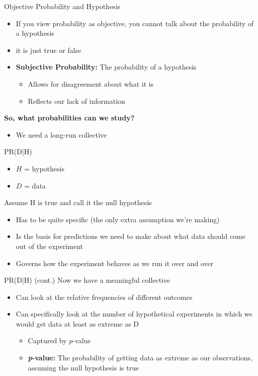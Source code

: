 \documentclass[12pt, block=fill]{beamer}
\begin{document}
\begin{frame}{Objective Probability and Hypothesis}
\begin{itemize}
    \item If you view probability as objective, you cannot talk about the probability of a hypothesis
    \item it is just true or false
    \item \textbf{Subjective Probability:} The probability of a hypothesis
    \begin{itemize}
        \item Allows for disagreement about what it is
        \item Reflects our lack of information
    \end{itemize}
\end{itemize}

\textbf{So, what probabilities can we study?}

\begin{itemize}
    \item We need a long-run collective
\end{itemize}

\end{frame}



\begin{frame}{PR(D|H)}
\begin{itemize}
    \item $H$ = hypothesis
    \item $D$ = data
\end{itemize}

Assume H is true and call it the null hypothesis
\begin{itemize}
    \item Has to be quite specific (the only extra assumption we're making)
    \item Is the basis for predictions we need to make about what data should come out of the experiment
    \item Governs how the experiment behaves as we run it over and over
\end{itemize}
\end{frame}



\begin{frame}{PR(D|H) (cont.)}
Now we have a meaningful collective
\begin{itemize}
    \item Can look at the relative frequencies of different outcomes
    \item Can specifically look at the number of hypothetical experiments in which we would get data at least as extreme as D
    \begin{itemize}
        \item Captured by $p$-value
        \item \textbf{\textit{p}-value:} The probability of getting data as extreme as our observations, assuming the null hypothesis is true
    \end{itemize}
\end{itemize}    
\end{frame}
\end{document}
